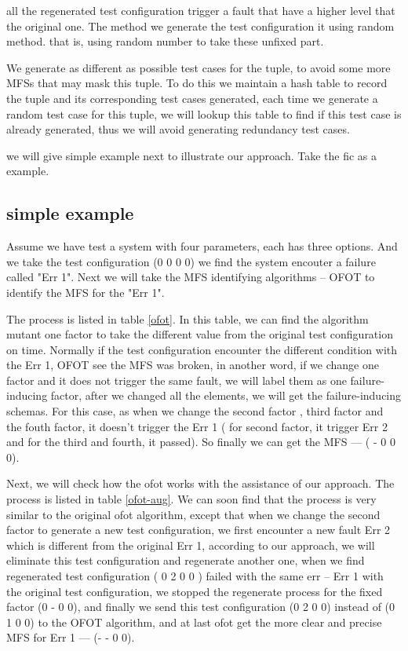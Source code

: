 \documentclass{sig-alternate}
\begin{document}
all the regenerated test configuration trigger a fault that have a higher level that the original one.
The method we generate the test configuration it using random method. that is, using random number to take these unfixed part.

We generate as different as possible test cases for the tuple, to avoid some more MFSs that may mask this tuple. To do this we maintain a hash table to record the tuple and its corresponding test cases generated, each time we generate a random test case for this tuple, we will lookup this table to find if this test case is already generated, thus we will avoid generating redundancy test cases.

we will give simple example next to illustrate our approach. Take the fic as a example.

\subsection{simple example}
Assume we have test a system with four parameters, each has three options. And we take the test configuration (0 0 0 0) we find the system encouter a failure called "Err 1". Next we will take the MFS identifying algorithms -- OFOT to identify the MFS for the "Err 1".

The process is listed in table \ref{ofot}. In this table, we can find the algorithm mutant one factor to take the different value from the original test configuration on time. Normally if the test configuration encounter the different condition with the Err 1, OFOT see the MFS was broken, in another word, if we change one factor and it does not trigger the same fault, we will label them as one failure-inducing factor, after we changed all the elements, we will get the failure-inducing schemas. For this case, as when we change the second factor , third factor and the fouth factor, it doesn't trigger the Err 1 ( for second factor, it trigger Err 2 and for the third and fourth, it passed). So finally we can get the MFS --- ( - 0 0 0).

Next, we will check how the ofot works with the assistance of our approach. The process is listed in table \ref{ofot-aug}. We can soon find that the process is very similar to the original ofot algorithm, except that when we change the second factor to generate a new test configuration, we first encounter a new fault Err 2 which is different from the original Err 1, according to our approach, we will eliminate this test configuration and regenerate another one, when we find regenerated test configuration ( 0 2 0 0 ) failed with the same err -- Err 1 with the original test configuration, we stopped the regenerate process for the fixed factor (0 - 0 0), and finally we send this test configuration (0 2 0 0) instead of (0 1 0 0) to the OFOT algorithm, and at last ofot get the more clear and precise MFS for Err 1 --- (- - 0 0).
\end{document}
